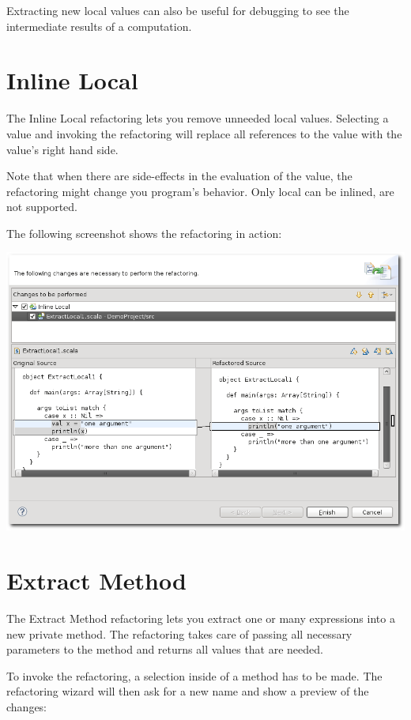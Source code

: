 \documentclass[10pt,a4paper,oneside]{scrreprt}
\begin{document}
Extracting new local values can also be useful for debugging to see the intermediate results of a computation.

\section{Inline Local}

The Inline Local refactoring lets you remove unneeded local values. Selecting a value and invoking the refactoring will replace all references to the value with the value's right hand side.

Note that when there are side-effects in the evaluation of the value, the refactoring might change you program's behavior. Only local  can be inlined,  are not supported.

The following screenshot shows the refactoring in action:

\begin{center}
  \includegraphics[width=\linewidth]{inline_local_screenshot_1.png}
\end{center}

\section{Extract Method}

The Extract Method refactoring lets you extract one or many expressions into a new private method. The refactoring takes care of passing all necessary parameters to the method and returns all values that are needed.

To invoke the refactoring, a selection inside of a method has to be made. The refactoring wizard will then ask for a new name and show a preview of the changes:
\end{document}
